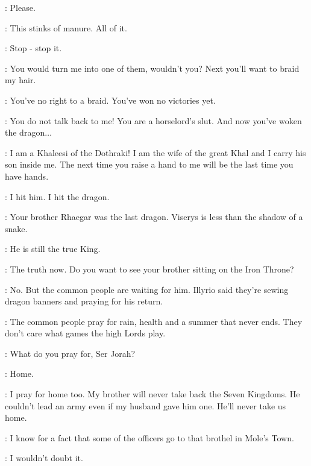 \DAENERYS: Please. 

\VISERYS: This stinks of manure. All of it. 

\DAENERYS: Stop - stop it. 

\VISERYS: You would turn me into one of them, wouldn't you? Next you'll want to braid my hair. 

\DAENERYS: You've no right to a braid. You've won no victories yet. 


\VISERYS: You do not talk back to me! You are a horselord's slut. And now you've woken the dragon$\ldots$ 


\DAENERYS: I am a Khaleesi of the Dothraki! I am the wife of the great Khal and I carry his son inside me. The next time you raise a hand to me will be the last time you have hands. 


\DAENERYS: I hit him. I hit the dragon. 

\JORAH: Your brother Rhaegar was the last dragon. Viserys is less than the shadow of a snake. 

\DAENERYS: He is still the true King. 

\JORAH: The truth now. Do you want to see your brother sitting on the Iron Throne? 

\DAENERYS: No. But the common people are waiting for him. Illyrio said they're sewing dragon banners and praying for his return. 

\JORAH: The common people pray for rain, health and a summer that never ends. They don't care what games the high Lords play. 

\DAENERYS: What do you pray for, Ser Jorah? 

\JORAH: Home. 

\DAENERYS: I pray for home too. My brother will never take back the Seven Kingdoms. He couldn't lead an army even if my husband gave him one. He'll never take us home. 

\scene



\SAM: I know for a fact that some of the officers go to that brothel in Mole's Town. 

\JON: I wouldn't doubt it. 

